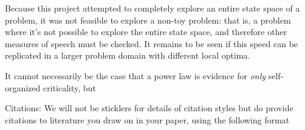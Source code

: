 \documentclass[12pt]{article}
\begin{document}
Because this project attempted to completely explore an entire state space of a problem, it was not feasible to explore a non-toy problem: that is, a problem where it's not possible to explore the entire state space, and therefore other measures of speech must be checked. It remains to be seen if this speed can be replicated in a larger problem domain with different local optima.


It cannot necessarily be the case that a power law is evidence for \emph{only} self-organized criticality, but %

\begin{thebibliography}[99]

Citations:   We will not be sticklers for details of citation styles but do provide citations to literature you draw on in your paper, using the following format
\end{thebibliography}
\end{document}
